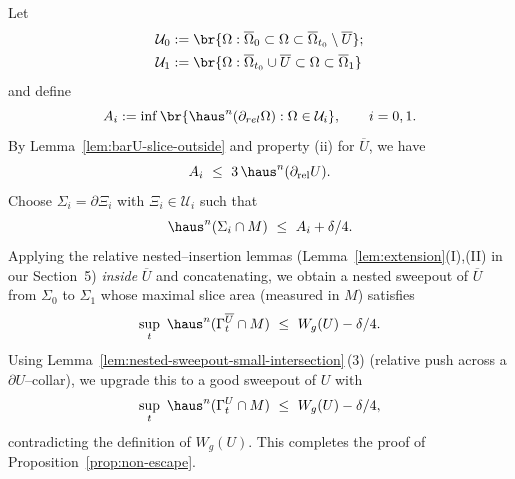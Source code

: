 Let 
\begin{equation*}
    \begin{split}
        &\mathcal{U}_0:=\br{\Omega: \overline{\Omega}_0\subset \Omega\subset \overline{\Omega}_{t_0}\setminus \overline{U}};\\
        &\mathcal{U}_1:=\br{\Omega: \overline{\Omega}_{t_0}\cup \overline{U}\subset \Omega\subset \overline{\Omega}_1}
    \end{split}
\end{equation*}
and define
\begin{equation*}
  A_i:=\inf\br{\haus^n(\partial_{rel}\Omega) : \Omega\in\mathcal{U}_i},\qquad i=0,1.
\end{equation*}
By Lemma~\ref{lem:barU-slice-outside} and property (ii) for $\overline U$, we have 
\begin{equation*}
  A_i\ \le\ 3\,\haus^n(\partial_{\mathrm{rel}}U).
\end{equation*}
Choose $\Sigma_i=\partial\Xi_i$ with $\Xi_i\in\mathcal U_i$ such that 
\begin{equation*}
  \haus^n(\Sigma_i\cap M)\ \le\ A_i+\delta/4.
\end{equation*}
Applying the relative nested–insertion lemmas (Lemma~\ref{lem:extension}(I),(II) in our Section~5) \emph{inside} $\overline U$ and concatenating,
we obtain a nested sweepout of $\overline U$ from $\Sigma_0$ to $\Sigma_1$ whose maximal slice area (measured in $M$) satisfies
\begin{equation*}
  \sup_{t}\ \haus^n(\Gamma^{\overline U}_t\cap M)\ \le\ W_g(U)-\delta/4.
\end{equation*}
Using Lemma~\ref{lem:nested-sweepout-small-intersection}\,(3) (relative push across a $\partial U$–collar),
we upgrade this to a good sweepout of $U$ with
\begin{equation*}
  \sup_{t}\ \haus^n(\Gamma^{U}_t\cap M)\ \le\ W_g(U)-\delta/4,
\end{equation*}
contradicting the definition of $W_g(U)$. This completes the proof of Proposition~\ref{prop:non-escape}.
